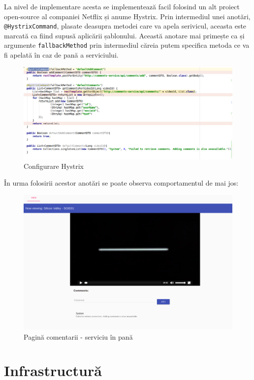 \documentclass[12pt, a4paper, oneside, romanian]{teza-upb}
\begin{document}
La nivel de implementare acesta se implementează facil folosind un alt proiect open-source al companiei Netflix și anume Hystrix. Prin intermediul unei anotări, \texttt{@HystrixCommand}, plasate deasupra metodei care va apela serivicul, aceasta este marcată ca fiind supusă aplicării șablonului. Această anotare mai primește ca și argumente \texttt{fallbackMethod} prin intermediul căreia putem specifica metoda ce va fi apelată în caz de pană a 
serviciului.

\begin{figure}[ht]
\centering
\includegraphics[scale=0.5]{img/springboot-fallback.png}
\caption{Configurare Hystrix}
\label{fig:arhi_componente}
\end{figure}
\newpage
În urma folosirii acestor anotări se poate observa comportamentul de mai jos:

\begin{figure}[ht]
\centering
\includegraphics[scale=0.25]{img/comments-not-working.png}
\caption{Pagină comentarii - serviciu în pană}
\label{fig:arhi_componente}
\end{figure}

\newpage
\section{Infrastructură}
\end{document}
